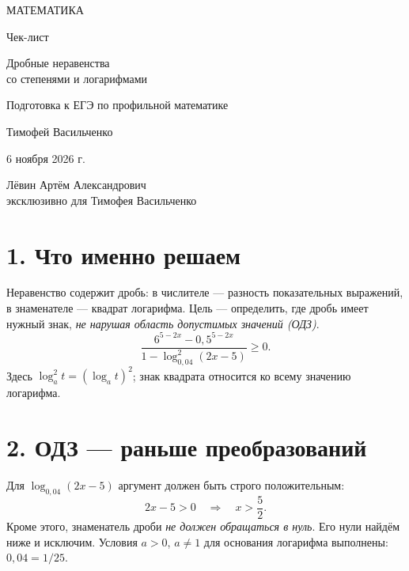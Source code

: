 \documentclass[a4paper,12pt]{article}
\begin{document}
\hypersetup{pageanchor=false}
\begin{titlepage}
\thispagestyle{empty}
\centering
\vspace*{22mm}
{\large\color{darkaccent} МАТЕМАТИКА}\par
\vspace{17mm}
{\LARGE Чек-лист}\par
\vspace{14mm}
{\LARGE\color{accent} Дробные неравенства\\[5pt] со степенями и логарифмами}\par
\vspace{15mm}
{\large Подготовка к ЕГЭ по профильной математике}\par
\vfill
{\large Тимофей Васильченко}\par
\vspace{12mm}
{6 ноября 2026 г.}\par
\vspace{15mm}
{\small Лёвин Артём Александрович\\[2pt] эксклюзивно для Тимофея Васильченко}\par
\vspace{17mm}
\end{titlepage}
\setcounter{page}{1}
\hypersetup{pageanchor=true}

\section*{1. Что именно решаем}
Неравенство содержит дробь: в числителе --- разность показательных выражений, в знаменателе --- квадрат логарифма. Цель --- определить, где дробь имеет нужный знак, \emph{не нарушая область допустимых значений (ОДЗ)}.
\[
\frac{6^{5-2x}-0{,}5^{5-2x}}{1-\log_{0{,}04}^{2}(2x-5)}\ge 0.
\tag{1}\label{eq:main}
\]
Здесь $\log_a^2 t=(\log_a t)^2$; знак квадрата относится ко всему значению логарифма.

\section*{2. ОДЗ --- раньше преобразований}
Для $\log_{0{,}04}(2x-5)$ аргумент должен быть строго положительным:
\[
2x-5>0\quad\Longrightarrow\quad \boxed{x>\frac52}.
\]
Кроме этого, знаменатель дроби \emph{не должен обращаться в нуль}. Его нули найдём ниже и исключим. Условия $a>0$, $a\ne1$ для основания логарифма выполнены: $0{,}04=1/25$.
\end{document}
